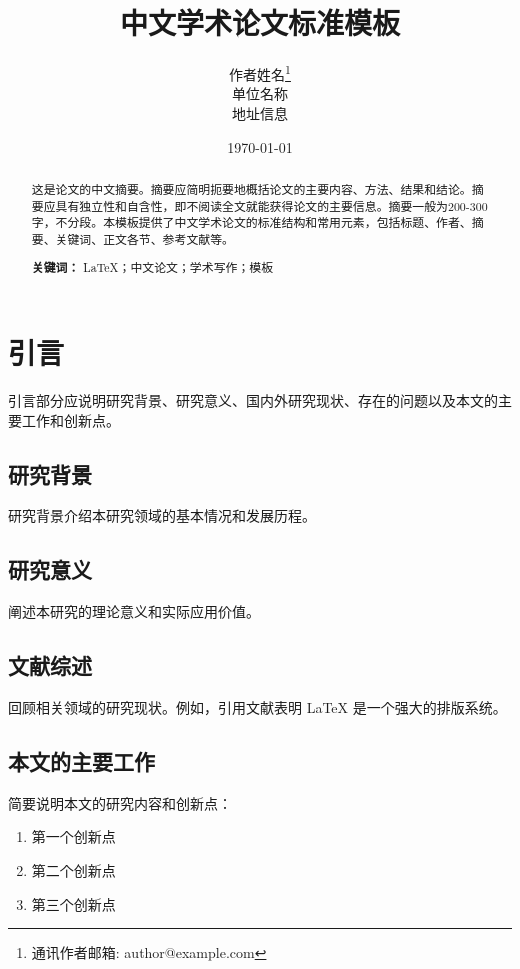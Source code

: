 \documentclass[12pt,a4paper]{article}
\title{\textbf{中文学术论文标准模板}}
\author{
    作者姓名\thanks{通讯作者邮箱: author@example.com} \\
    单位名称 \\
    地址信息
}
\date{\today}
\begin{document}
\maketitle

\begin{abstract}
这是论文的中文摘要。摘要应简明扼要地概括论文的主要内容、方法、结果和结论。摘要应具有独立性和自含性，即不阅读全文就能获得论文的主要信息。摘要一般为200-300字，不分段。本模板提供了中文学术论文的标准结构和常用元素，包括标题、作者、摘要、关键词、正文各节、参考文献等。

\vspace{1em}
\noindent \textbf{关键词：} LaTeX；中文论文；学术写作；模板
\end{abstract}



\section{引言}

引言部分应说明研究背景、研究意义、国内外研究现状、存在的问题以及本文的主要工作和创新点。

\subsection{研究背景}

研究背景介绍本研究领域的基本情况和发展历程。

\subsection{研究意义}

阐述本研究的理论意义和实际应用价值。

\subsection{文献综述}

回顾相关领域的研究现状。例如，引用文献\cite{latex}表明 LaTeX 是一个强大的排版系统。

\subsection{本文的主要工作}

简要说明本文的研究内容和创新点：
\begin{enumerate}
    \item 第一个创新点
    \item 第二个创新点
    \item 第三个创新点
\end{enumerate}
\end{document}
